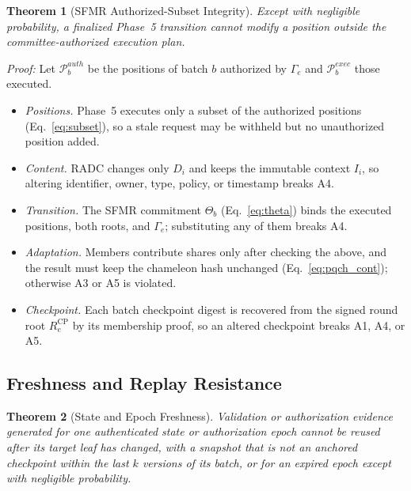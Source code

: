 \documentclass[lettersize,journal]{IEEEtran}
\newtheorem{theorem}{Theorem}
\begin{document}
\begin{theorem}[SFMR Authorized-Subset Integrity]
Except with negligible probability, a finalized Phase~5 transition
cannot modify a position outside the committee-authorized execution
plan.
\end{theorem}

\emph{Proof:} Let $\mathcal{P}_b^{auth}$ be the positions of batch $b$
authorized by $\Gamma_e$ and $\mathcal{P}_b^{exec}$ those executed.
\begin{itemize}[leftmargin=*,nosep]
\item \emph{Positions.} Phase~5 executes only a subset of the authorized
positions (Eq.~\eqref{eq:subset}), so a stale request may be withheld
but no unauthorized position added.
\item \emph{Content.} RADC changes only $D_i$ and keeps the immutable
context $I_i$, so altering identifier, owner, type, policy, or timestamp
breaks A4.
\item \emph{Transition.} The SFMR commitment $\Theta_b$
(Eq.~\eqref{eq:theta}) binds the executed positions, both roots, and
$\Gamma_e$; substituting any of them breaks A4.
\item \emph{Adaptation.} Members contribute shares only after checking
the above, and the result must keep the chameleon hash unchanged
(Eq.~\eqref{eq:pqch_cont}); otherwise A3 or A5 is violated.
\item \emph{Checkpoint.} Each batch checkpoint digest is recovered from
the signed round root $R_e^{\mathrm{CP}}$ by its membership proof, so an
altered checkpoint breaks A1, A4, or A5.
\end{itemize}

\subsection{Freshness and Replay Resistance}

\begin{theorem}[State and Epoch Freshness]
Validation or authorization evidence generated for one authenticated
state or authorization epoch cannot be reused after its
target leaf has changed, with a snapshot that is not an anchored
checkpoint within the last $k$ versions of its batch, or for an expired
epoch except with negligible probability.
\end{theorem}
\end{document}
